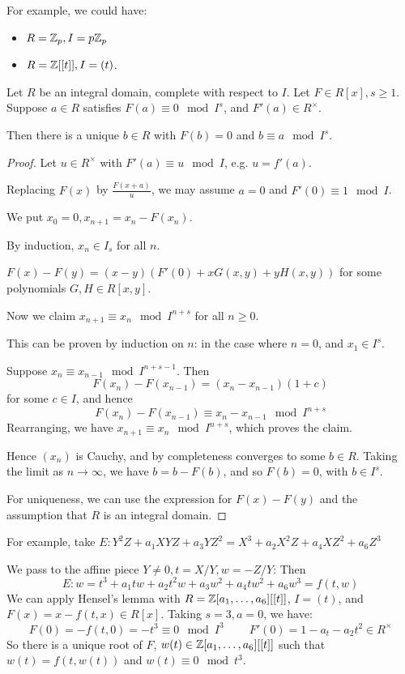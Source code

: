 \documentclass[10pt,a4paper]{article}
\begin{document}
For example, we could have:
\begin{itemize}
  \item $R = \mathbb{Z}_p, I = p\mathbb{Z}_p$
  \item $R = \mathbb{Z}[[t]], I = (t)$.
\end{itemize}
\begin{lemma}
  Let $R$ be an integral domain, complete with respect to $I$. Let $F \in R[x], s \geq 1$. Suppose $a \in R$ satisfies $F(a) \equiv 0 \mod I^s$, and $F'(a) \in R^\times$.

  Then there is a unique $b \in R$ with $F(b) = 0$ and $b \equiv a \mod I^s$.
\end{lemma}
\begin{proof}
  Let $u \in R^\times$ with $F'(a) \equiv u \mod I$, e.g. $u = f'(a)$.

  Replacing $F(x)$ by $\frac{F(x+a)}{u}$, we may assume $a = 0$ and $F'(0) \equiv 1 \mod I$.

  We put $x_0 = 0, x_{n+1} = x_n-F(x_n)$.

  By induction, $x_n \in I_s$ for all $n$.

  $F(x)-F(y) = (x-y)(F'(0)+xG(x,y) +yH(x,y))$ for some polynomials $G, H \in R[x,y]$.

  Now we claim $x_{n+1} \equiv x_n \mod I^{n+s}$ for all $n \geq 0$.

  This can be proven by induction on $n$: in the case where $n=0$, and $x_1 \in I^s$.

  Suppose $x_{n}\equiv x_{n-1} \mod I^{n+s-1}$. Then
  \[F(x_n)-F(x_{n-1})=(x_n-x_{n-1})(1+c)\]
  for some $c \in I$, and hence
  \[F(x_n) - F(x_{n-1}) \equiv x_n-x_{n-1} \mod I^{n+s}\]
  Rearranging, we have $x_{n+1} \equiv x_n \mod I^{n+s}$, which proves the claim.

  Hence $(x_n)$ is Cauchy, and by completeness converges to some $b \in R$. Taking the limit as $n \to \infty$, we have $b = b-F(b)$, and so $F(b)=0$, with $b \in I^s$.

  For uniqueness, we can use the expression for $F(x)-F(y)$ and the assumption that $R$ is an integral domain.
\end{proof}
For example, take $E: Y^2Z + a_1XYZ+a_3YZ^2 = X^3+a_2X^2Z + a_4 XZ^2 + a_6Z^3$

We pass to the affine piece $Y \neq 0, t = X/Y, w = -Z/Y$: Then
\[E : w = t^3+a_1tw + a_2t^2w + a_3w^2+a_4tw^2+a_6w^3 = f(t,w)\]
We can apply Hensel's lemma with $R = \mathbb{Z}[a_1, \ldots, a_6][[t]]$, $I = (t)$, and $F(x) = x-f(t,x)\in R[x]$. Taking $s = 3, a = 0$, we have:
\[F(0) = -f(t, 0) = -t^3 \equiv 0 \mod I^3\;\;\;\;\;\;\;\;
F'(0) = 1-a_t-a_2t^2  \in R^\times\]
So there is a unique root of $F$, $w(t) \in \mathbb{Z}[a_1, \ldots, a_6][[t]]$ such that $w(t) = f(t,w(t))$ and $w(t) \equiv 0 \mod t^3$.
\end{document}
